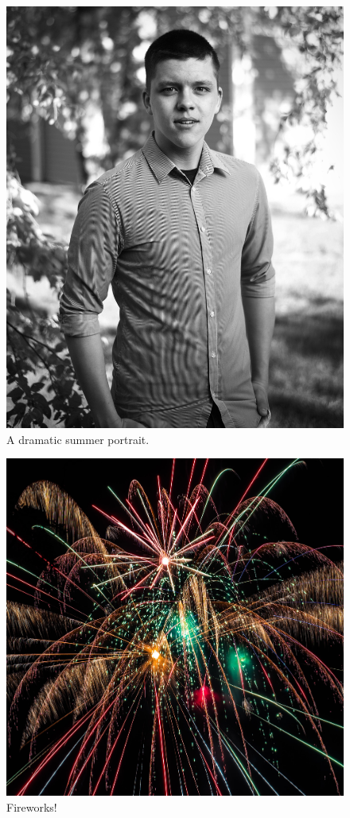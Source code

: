 \documentclass{report}
\begin{document}
\begin{figure}
  \includegraphics[width=\linewidth]{res/portraitbw.jpg}
  \caption{A dramatic summer portrait.}
\end{figure}

\begin{figure}
  \includegraphics[width=\linewidth]{res/fireworks.jpg}
  \caption{Fireworks!}
\end{figure}
\end{document}
